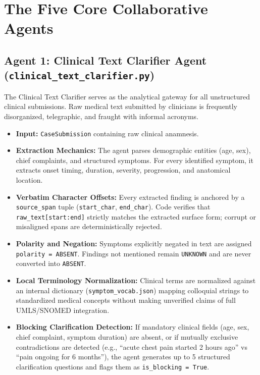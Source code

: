 \documentclass[12pt,a4paper]{report}
\begin{document}
\section{The Five Core Collaborative Agents}

\subsection{Agent 1: Clinical Text Clarifier Agent (\texttt{clinical\_text\_clarifier.py})}
The Clinical Text Clarifier serves as the analytical gateway for all unstructured clinical submissions. Raw medical text submitted by clinicians is frequently disorganized, telegraphic, and fraught with informal acronyms. 
\begin{itemize}
    \item \textbf{Input:} \texttt{CaseSubmission} containing raw clinical anamnesis.
    \item \textbf{Extraction Mechanics:} The agent parses demographic entities (age, sex), chief complaints, and structured symptoms. For every identified symptom, it extracts onset timing, duration, severity, progression, and anatomical location.
    \item \textbf{Verbatim Character Offsets:} Every extracted finding is anchored by a \texttt{source\_span} tuple (\texttt{start\_char}, \texttt{end\_char}). Code verifies that \texttt{raw\_text[start:end]} strictly matches the extracted surface form; corrupt or misaligned spans are deterministically rejected.
    \item \textbf{Polarity and Negation:} Symptoms explicitly negated in text are assigned \texttt{polarity = ABSENT}. Findings not mentioned remain \texttt{UNKNOWN} and are never converted into \texttt{ABSENT}.
    \item \textbf{Local Terminology Normalization:} Clinical terms are normalized against an internal dictionary (\texttt{symptom\_vocab.json}) mapping colloquial strings to standardized medical concepts without making unverified claims of full UMLS/SNOMED integration.
    \item \textbf{Blocking Clarification Detection:} If mandatory clinical fields (age, sex, chief complaint, symptom duration) are absent, or if mutually exclusive contradictions are detected (e.g., ``acute chest pain started 2 hours ago'' vs ``pain ongoing for 6 months''), the agent generates up to 5 structured clarification questions and flags them as \texttt{is\_blocking = True}.
\end{itemize}
\end{document}
